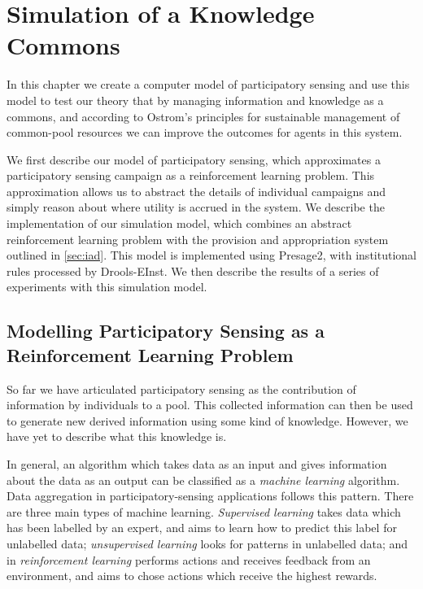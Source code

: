 \acresetall
\chapter{Simulation of a Knowledge Commons}\label{ch:results}

In this chapter we create a computer model of participatory sensing and use
this model to test our theory that by managing information and knowledge as a
commons, and according to Ostrom's principles for sustainable management of
common-pool resources we can improve the outcomes for agents in this system.

We first describe our model of participatory sensing, which approximates a
participatory sensing campaign as a reinforcement learning problem. This
approximation allows us to abstract the details of individual campaigns and
simply reason about where utility is accrued in the system.  We describe the
implementation of our simulation model, which combines an abstract
reinforcement learning problem with the provision and appropriation system
outlined in \autoref{sec:iad}. This model is implemented using Presage2, with
institutional rules processed by Drools-EInst. We then describe the results of
a series of experiments with this simulation model.

\section{Modelling Participatory Sensing as a Reinforcement Learning Problem}

So far we have articulated participatory sensing as the contribution of
information by individuals to a pool. This collected information can then be
used to generate new derived information using some kind of knowledge.
However, we have yet to describe what this knowledge is.

In general, an algorithm which takes data as an input and gives information
about the data as an output can be classified as a \emph{machine learning}
algorithm. Data aggregation in participatory-sensing applications follows this
pattern. There are three main types of machine learning. \emph{Supervised
learning} takes data which has been labelled by an expert, and aims to learn
how to predict this label for unlabelled data; \emph{unsupervised learning}
looks for patterns in unlabelled data; and in \emph{reinforcement learning}
performs actions and receives feedback from an environment, and aims to chose
actions which receive the highest rewards.

